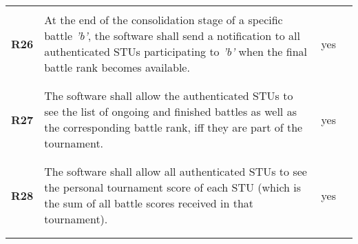 \begin{longtable}[H]{l p{6.5cm} l p{3cm}}
                 &                                                                                                                                                                                                                       &                      &                                                                                         \\\hline & & & \\
    \textbf{R26} & At the end of the consolidation stage of a specific battle \textit{'b'}, the software shall send a notification to all authenticated STUs participating to \textit{'b'} when the final battle rank becomes available. & {\color{green}yes}   &                                                                                         \\
                 &                                                                                                                                                                                                                       &                      &                                                                                         \\\hline & & & \\
    \textbf{R27} & The software shall allow the authenticated STUs to see the list of ongoing and finished battles as well as the corresponding battle rank, iff they are part of the tournament.                                        & {\color{green}yes}   &                                                                                         \\
                 &                                                                                                                                                                                                                       &                      &                                                                                         \\\hline & & & \\
    \textbf{R28} & The software shall allow all authenticated STUs to see the personal tournament score of each STU (which is the sum of all battle scores received in that tournament).                                                 & {\color{green}yes}   &                                                                                         \\
                 &                                                                                                                                                                                                                       &                      &                                                                                         \\\hline & & & \\

\end{longtable}
